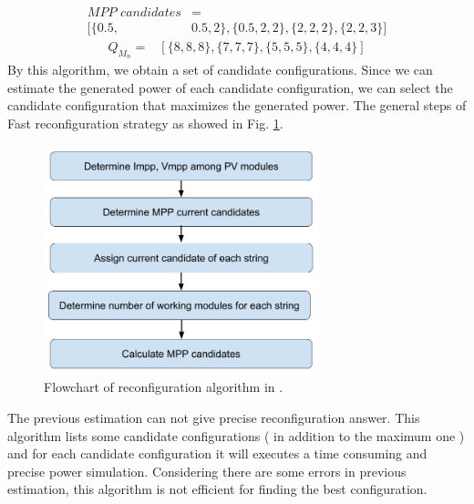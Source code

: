 \documentclass[conference]{IEEEtran}
\begin{document}
\begin{equation}
\begin{aligned}
\textit{MPP candidates}& = \\ [\{ 0.5, &0.5, 2\}, \{0.5, 2, 2\}, \{2, 2, 2\}, \{2, 2, 3\}]
\end{aligned}\label{mpp}
\end{equation}
\begin{equation}
\begin{aligned}
\textit{$Q_{M_n}$} = &  [\{8, 8, 8\}, \{7, 7, 7\}, \{5, 5, 5\}, \{4, 4, 4\}]
\end{aligned}
\label{qmn}
\end{equation}
By this algorithm, we obtain a set of candidate configurations. Since we can estimate the generated power of each candidate configuration, we can select the candidate configuration that maximizes the generated power.
The general steps of Fast reconfiguration strategy as showed in Fig. \ref{flowchart}. 
\begin{figure}[htbp]
\centerline{\includegraphics[width=8cm]{flowchart(1).png}}
\caption{Flowchart of reconfiguration algorithm in \cite{b10}.}
\label{flowchart}
\end{figure}
The previous estimation can not give precise reconfiguration answer. This algorithm lists some candidate configurations ( in addition to the maximum one ) and for each candidate configuration it will executes a time consuming and precise power simulation. Considering there are some errors in previous estimation, this algorithm is not efficient for finding the best configuration. 
\end{document}
